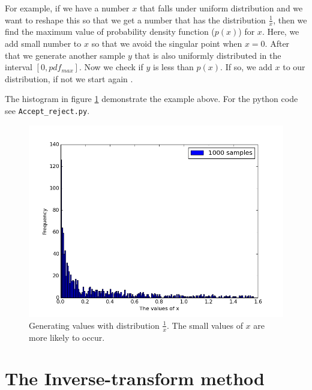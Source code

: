  
For example, if we have a number $x$ that falls under uniform distribution and we want to reshape this so that we get a number  that has the distribution $\frac{1}{x}$, then we find the maximum value of probability density function ($p(x)$) for $x$. Here, we add small number to $x$ so that we avoid the singular point when $x = 0$. After that we generate another sample $y$ that is also uniformly distributed in the interval $[0,pdf_{max}]$. 
Now we check if $y $ is less than $p(x)$. If so, we add $x$ to our distribution, if not we start again \citep{Weinzierl}. 

The histogram in figure \ref{fig:2} demonstrate the example above. For the python code see \verb+Accept_reject.py+. 

\begin{figure}[hbtp]
\centering
\includegraphics[scale=.5]{images/The_inverse_dist.png}
\caption{Generating values with distribution $\frac{1}{x}$. The small values of $x$ are more likely to occur.}\label{fig:2}
\end{figure}




\section{The Inverse-transform method}

